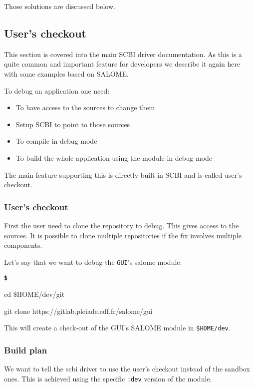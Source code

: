 \documentclass[a4paper,12pt,twoside]{article}
\newenvironment{shellcommand}{
	\begin{list}{ %
			\bfseries\texttt \$
		}{ %
			\ttfamily
			\setlength{\topsep}{-0.3ex}
			\setlength{\labelwidth}{1in}
			\setlength{\leftmargin}{0.7in}
			\setlength{\labelsep}{0.5ex}
			\setlength{\rightmargin}{0.5in}
			\setlength{\itemsep}{1ex}
			\setlength{\parsep}{0ex}
			\setlength{\listparindent}{0.5in}
		}
	}{
	\end{list}
}
\newcommand{\code}[1]{\texttt{#1}}
\begin{document}
Those solutions are discussed below.

\subsection{User's checkout}

This section is covered into the main SCBI driver documentation. As this is a quite common and important feature for developers we describe it again here with some examples based on SALOME.

To debug an application one need:

\begin{itemize}
	\item To have access to the sources to change them
	\item Setup SCBI to point to those sources
	\item To compile in debug mode
	\item To build the whole application using the module in debug mode
\end{itemize}

The main feature supporting this is directly built-in SCBI and is called user's checkout.

\subsubsection{User's checkout}
\label{user:checkout}
First the user need to clone the repository to debug. This gives access to the sources. It is possible to clone multiple repositories if the fix involves multiple components.

Let's say that we want to debug the \code{GUI}'s salome module.

\begin{shellcommand}
	\item cd \$HOME/dev/git
	\item git clone https://gitlab.pleiade.edf.fr/salome/gui
\end{shellcommand}

This will create a check-out of the GUI's SALOME module in \code{\$HOME/dev}.

\subsubsection{Build plan}

We want to tell the scbi driver to use the user's checkout instead of the sandbox ones. This is achieved using the specific \code{:dev} version of the module.
\end{document}
